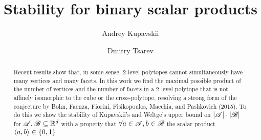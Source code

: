 

\title{\textbf{Stability for binary scalar products}}
\author[1]{Andrey Kupavskii}
\author[2]{Dmitry Tsarev}
\date{}



\maketitle

\begin{abstract}
    Recent results show that, in some sense, 2-level polytopes cannot simultaneously have many vertices and many facets. In this work we find the maximal possible product of the number of vertices and the number of facets in a 2-level polytope that is not affinely isomorphic to the cube or the cross-polytope, resolving a strong form of the conjecture by Bohn, Faenza, Fiorini, Fisikopoulos, Macchia, and Pashkovich (2015). To do this we show the stability of Kupavskii's and Weltge's upper bound on $\left|{\mathscr{A}}\right|\cdot\left|{\mathscr{B}}\right|$ for ${\mathscr{A}},{\mathscr{B}} \subseteq {\mathbb{R}}^d$ with a property that $\forall a \in {\mathscr{A}}, b \in {\mathscr{B}}$ the scalar product $\langle a, b\rangle \in\{0,1\}$.
\end{abstract}








\nocite{*}



